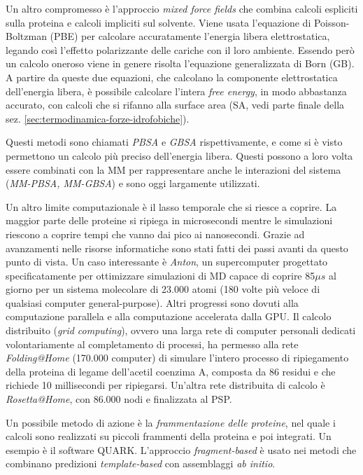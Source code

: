 {\par Un altro compromesso è l'approccio \textit{mixed force fields} che combina calcoli espliciti sulla proteina e calcoli impliciti sul solvente. Viene usata l'equazione di Poisson-Boltzman (PBE) per calcolare accuratamente l'energia libera elettrostatica, legando così l'effetto polarizzante delle cariche con il loro ambiente. Essendo però un calcolo oneroso viene in genere risolta l'equazione generalizzata di Born (GB). A partire da queste due equazioni, che calcolano la componente elettrostatica dell'energia libera, è possibile calcolare l'intera \textit{free energy}, in modo abbastanza accurato, con calcoli che si rifanno alla surface area (SA, vedi parte finale della sez. \ref{sec:termodinamica-forze-idrofobiche}). 

\par Questi metodi sono chiamati \textit{PBSA} e \textit{GBSA} rispettivamente, e come si è visto permettono un calcolo più preciso dell'energia libera. Questi possono a loro volta essere combinati con la MM per rappresentare anche le interazioni del sistema (\textit{MM-PBSA, MM-GBSA}) e sono oggi largamente utilizzati.

\par Un altro limite computazionale è il lasso temporale che si riesce a coprire. La maggior parte delle proteine si ripiega in microsecondi mentre le simulazioni riescono a coprire tempi che vanno dai pico ai nanosecondi. Grazie ad avanzamenti nelle risorse informatiche sono stati fatti dei passi avanti da questo punto di vista. Un caso interessante è \textit{Anton}, un supercomputer progettato specificatamente per ottimizzare simulazioni di MD capace di coprire 85$\mu s$ al giorno per un sistema molecolare di 23.000 atomi (180 volte più veloce di qualsiasi computer general-purpose). Altri progressi sono dovuti alla computazione parallela e alla computazione accelerata dalla GPU. Il calcolo distribuito (\textit{grid computing}), ovvero una larga rete di computer personali dedicati volontariamente al completamento di processi, ha permesso alla rete \textit{Folding@Home} (170.000 computer) di simulare l'intero processo di ripiegamento della proteina di legame dell'acetil coenzima A, composta da 86 residui e che richiede 10 millisecondi per ripiegarsi. Un'altra rete distribuita di calcolo è \textit{Rosetta@Home}, con 86.000 nodi e finalizzata al PSP. \\

\par Un possibile metodo di azione è la \textit{frammentazione delle proteine}, nel quale i calcoli sono realizzati su piccoli frammenti della proteina e poi integrati. Un esempio è il software QUARK. L'approccio \textit{fragment-based} è usato nei metodi che combinano predizioni \textit{template-based} con assemblaggi \textit{ab initio}.

}

